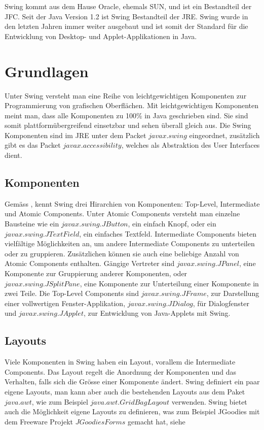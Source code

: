   Swing kommt aus dem Hause Oracle, ehemals SUN, und ist ein Bestandteil der
  \ac{JFC}. Seit der Java Version 1.2 ist Swing Bestandteil der \ac{JRE}. Swing
  wurde in den letzten Jahren immer weiter ausgebaut und ist somit der Standard
  für die Entwicklung von Desktop- und Applet-Applikationen in Java.
  
  \section{Grundlagen}
  
  Unter Swing versteht man eine Reihe von leichtgewichtigen Komponenten zur
  Programmierung von grafischen Oberflächen. Mit leichtgewichtigen Komponenten
  meint man, dass alle Komponenten zu 100\% in Java geschrieben sind. Sie sind
  somit plattformübergreifend einsetzbar und sehen überall gleich aus. Die Swing
  Komponenten sind im \ac{JRE} unter dem Packet \(javax.swing\) eingeordnet,
  zusätzlich gibt es das Packet \(javax.accessibility\), welches als
  Abstraktion des User Interfaces dient.
  
  \subsection{Komponenten}
  
  Gemäss \cite{SwingComponentsHighscore}, kennt Swing drei Hirarchien von
  Komponenten: Top-Level, Intermediate und Atomic Components.
  Unter Atomic Components versteht man einzelne Bausteine wie ein
  \(javax.swing.JButton\), ein einfach Knopf, oder ein
  \(javax.swing.JTextField\), ein einfaches Textfeld.
  Intermediate Components bieten vielfältige Möglichkeiten an, um andere
  Intermediate Components zu unterteilen oder zu gruppieren. Zusätzlichen
  können sie auch eine beliebige Anzahl von Atomic Components enthalten. Gängige
  Vertreter sind \(javax.swing.JPanel\), eine Komponente zur Gruppierung anderer
  Komponenten, oder \(javax.swing.JSplitPane\), eine Komponente zur
  Unterteilung einer Komponente in zwei Teile.
  Die Top-Level Components sind \(javax.swing.JFrame\),
  zur Darstellung einer vollwertigen Fenster-Applikation,
  \(javax.swing.JDialog\), für Dialogfenster und \(javax.swing.JApplet\), zur
  Entwicklung von Java-Applets mit Swing.
  
  \subsection{Layouts}
  
  Viele Komponenten in Swing haben ein Layout, vorallem die Intermediate
  Components. Das Layout regelt die Anordnung der Komponenten und das Verhalten,
  falls sich die Grösse einer Komponente ändert. Swing definiert ein paar eigene
  Layouts, man kann aber auch die bestehenden Layouts aus dem Paket
  \(java.awt\), wie zum Beispiel \(java.awt.GridBagLayout\) verwenden. Swing
  bietet auch die Möglichkeit eigene Layouts zu definieren, was zum Beispiel
  JGoodies mit dem Freeware Projekt \(JGoodies Forms\) gemacht hat, siehe
  \cite{JGoodiesForms}
    
